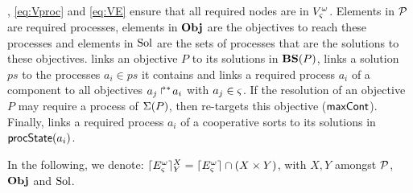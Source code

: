 , \eqref{eq:Vproc} and \eqref{eq:VE} ensure that all required nodes are in $V_\varsigma^\omega$.
Elements in $\mathcal{P}$ are required processes,
elements in $\mathbf{Obj}$ are the objectives to reach these processes
and elements in $\mathrm{Sol}$ are the sets of processes that are the solutions to these objectives.
 links an objective $P$ to its solutions in $\mathbf{BS}(P)$,
 links a solution $ps$ to the processes $a_i \in ps$ it contains and
 links a required process $a_i$ of a component to all objectives $\mbox{${a}_{j}\Rsh^*\!{a}_{i}$}$ with $a_j \in \varsigma$.
If the resolution of an objective $P$ may require a process of $\Sigma(P)$, then  re-targets this objective ($\mathsf{maxCont}$).
Finally,  links a required process $a_i$ of a cooperative sorts to its solutions in $\mathsf{procState}(a_i)$.

In the following, we denote:
$\lceil E_\varsigma^\omega\rceil^{X}_{Y} = \lceil E_\varsigma^\omega\rceil \cap (X \times Y)$, with $X, Y$ amongst $\mathcal{P}$, $\mathbf{Obj}$ and $\mathrm{Sol}$.
%
